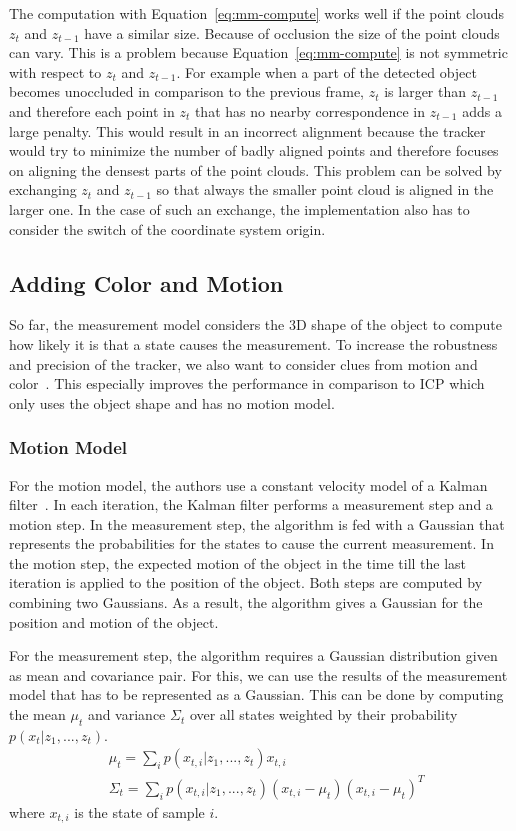 \documentclass[twoside,a4paper,article]{combine}
\begin{document}
The computation with Equation~\ref{eq:mm-compute} works well if the
point clouds $z_t$ and $z_{t-1}$ have a similar size. Because of
occlusion the size of the point clouds can vary. This is a problem
because Equation~\ref{eq:mm-compute} is not symmetric with respect to
$z_t$ and $z_{t-1}$. For example when a part of the detected object
becomes unoccluded in comparison to the previous frame, $z_t$ is
larger than $z_{t-1}$ and therefore each point in $z_t$ that has no
nearby correspondence in $z_{t-1}$ adds a large penalty. This would
result in an incorrect alignment because the tracker would try to
minimize the number of badly aligned points and therefore focuses on
aligning the densest parts of the point clouds. This problem can be
solved by exchanging $z_t$ and $z_{t-1}$ so that always the smaller
point cloud is aligned in the larger one. In the case of such an
exchange, the implementation also has to consider the switch of the
coordinate system origin.

\subsection{Adding Color and Motion}
\label{sub:adding-color}
So far, the measurement model considers the 3D shape of the object to
compute how likely it is that a state causes the measurement.
To increase the robustness and precision of the tracker, we
also want to consider clues from motion and color~\cite{paper}. This especially
improves the performance in comparison to ICP which only uses the
object shape and has no motion model.

\subsubsection{Motion Model}
For the motion model, the authors use a constant velocity model of a Kalman
filter~\cite{prob-rob}. In each iteration, the Kalman filter performs
a measurement step and a motion step. In the measurement step, the algorithm
is fed with a Gaussian that represents the
probabilities for the states to cause the current
measurement. In the motion step, the
expected motion of the object in the time till the last iteration is
applied to the position of the object. Both steps are computed by
combining two Gaussians. As a result, the algorithm gives a Gaussian
for the position and motion of the object.

For the measurement step, the algorithm requires a Gaussian distribution
given as mean and covariance pair.
For this, we can use the results of the measurement model that
has to be represented as a Gaussian. This can be done by computing
the mean $\mu_t$ and variance $\Sigma_t$ over all states weighted by
their probability $p(x_t|z_1,...,z_t)$.
\begin{align}
\label{eq:motion-model}
& \mu_t=\sum_i p(x_{t,i}|z_1,...,z_t)x_{t,i}\nonumber\\
& \Sigma_t=\sum_i p(x_{t,i}|z_1,...,z_t) (x_{t,i}-\mu_t)(x_{t,i}-\mu_t)^T\nonumber
\end{align}
where $x_{t,i}$ is the state of sample $i$.
\end{document}
